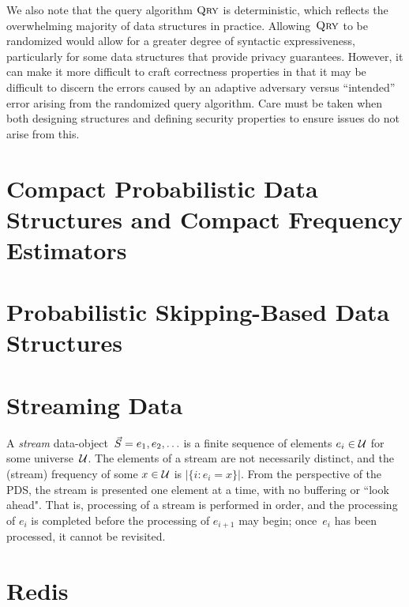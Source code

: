 We also note that the query algorithm $\textnormal{\textsc{Qry}}$ is deterministic, which reflects the overwhelming majority of data structures in practice. Allowing~$\textnormal{\textsc{Qry}}$ to be randomized would allow for a greater degree of syntactic expressiveness, particularly for some data structures that provide privacy guarantees. However, it can make it more difficult to craft correctness properties in that it may be difficult to discern the errors caused by an adaptive adversary versus ``intended'' error arising from the randomized query algorithm. Care must be taken when both designing structures and defining security properties to ensure issues do not arise from this.  

\section{Compact Probabilistic Data Structures and Compact Frequency Estimators}

\section{Probabilistic Skipping-Based Data Structures}

\section{Streaming Data}

A \emph{stream} data-object~$\vec{S} = e_1,e_2,\ldots$ is a finite sequence of elements $e_i \in \mathcal{U}$ for some universe~$\mathcal{U}$.  
The elements of a stream are not necessarily distinct, and the (stream) frequency of some $x \in \mathcal{U}$ is $|\{i: e_i=x \}|$.  
From the perspective of the PDS, the stream is presented one element at a time, with no buffering or ``look ahead".  
That is, processing of a stream is performed in order, and the processing of $e_i$ is completed before the processing of $e_{i+1}$ may begin; once~$e_i$ has been processed, it cannot be revisited.

\section{Redis}

